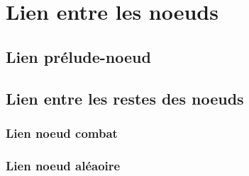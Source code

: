 \chapter{Lien entre les noeuds}

	\section{Lien prélude-noeud}

	\section{Lien entre les restes des noeuds}

		\subsection{Lien noeud combat}\label{subsection:lienCombat}

		\subsection{Lien noeud aléaoire}\label{subsection:lienAléatoire}
